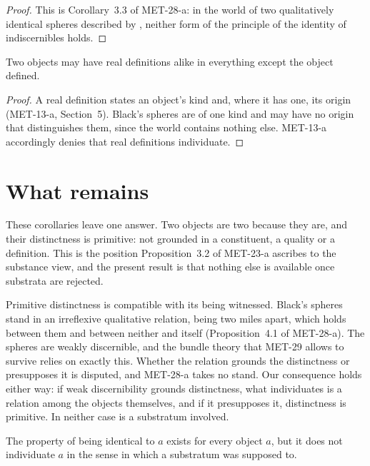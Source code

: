 \documentclass{situationist-preprint}
\begin{document}
\begin{proof}
This is Corollary~3.3 of MET-28-a: in the world of two qualitatively identical spheres described by \citet{Black1952}, neither form of the principle of the identity of indiscernibles holds.
\end{proof}

\begin{corollary}\label{c:def}
Two objects may have real definitions alike in everything except the object defined.
\end{corollary}

\begin{proof}
A real definition states an object's kind and, where it has one, its origin (MET-13-a, Section~5). Black's spheres are of one kind and may have no origin that distinguishes them, since the world contains nothing else. MET-13-a accordingly denies that real definitions individuate.
\end{proof}

\section{What remains}

These corollaries leave one answer. Two objects are two because they are, and their distinctness is primitive: not grounded in a constituent, a quality or a definition. This is the position Proposition~3.2 of MET-23-a ascribes to the substance view, and the present result is that nothing else is available once substrata are rejected.

Primitive distinctness is compatible with its being witnessed. Black's spheres stand in an irreflexive qualitative relation, being two miles apart, which holds between them and between neither and itself (Proposition~4.1 of MET-28-a). The spheres are weakly discernible, and the bundle theory that MET-29 allows to survive relies on exactly this. Whether the relation grounds the distinctness or presupposes it is disputed, and MET-28-a takes no stand. Our consequence holds either way: if weak discernibility grounds distinctness, what individuates is a relation among the objects themselves, and if it presupposes it, distinctness is primitive. In neither case is a substratum involved.

\begin{corollary}\label{c:haec}
The property of being identical to $a$ exists for every object $a$, but it does not individuate $a$ in the sense in which a substratum was supposed to.
\end{corollary}
\end{document}
